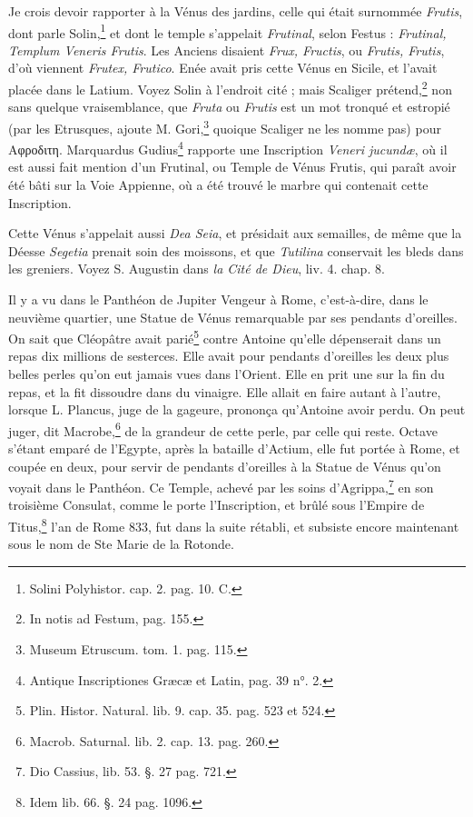 \documentclass[a4paper, 11pt, oneside, polutonikogreek, french]{article}
\begin{document}
Je crois devoir rapporter à la Vénus des jardins, celle qui était surnommée \emph{Frutis}, dont parle Solin,\footnote{Solini Polyhistor. cap. 2. pag. 10. C.} et dont le temple s'appelait \emph{Frutinal}, selon Festus : \emph{Frutinal, Templum Veneris Frutis}. Les Anciens disaient \emph{Frux, Fructis}, ou \emph{Frutis, Frutis}, d'où viennent \emph{Frutex, Frutico}. Enée avait pris cette Vénus en Sicile, et l'avait placée dans le Latium. Voyez Solin à l'endroit cité ; mais Scaliger prétend,\footnote{In notis ad Festum, pag. 155.} non sans quelque vraisemblance, que \emph{Fruta} ou \emph{Frutis} est un mot tronqué et estropié (par les Etrusques, ajoute M. Gori,\footnote{Museum Etruscum. tom. 1. pag. 115.} quoique Scaliger ne les nomme pas) pour Αφροδιτη. Marquardus Gudius\footnote{Antique Inscriptiones Græcæ et Latin, pag. 39 n°. 2.} rapporte une Inscription \emph{Veneri jucundæ}, où il est aussi fait mention d'un Frutinal, ou Temple de Vénus Frutis, qui paraît avoir été bâti sur la Voie Appienne, où a été trouvé le marbre qui contenait cette Inscription.

Cette Vénus s'appelait aussi \emph{Dea Seia}, et présidait aux semailles, de même que la Déesse \emph{Segetia} prenait soin des moissons, et que \emph{Tutilina} conservait les bleds dans les greniers. Voyez S. Augustin dans \emph{la Cité de Dieu}, liv. 4. chap. 8.

Il y a vu dans le Panthéon de Jupiter Vengeur à Rome, c'est-à-dire, dans le neuvième quartier, une Statue de Vénus remarquable par ses pendants d'oreilles. On sait que Cléopâtre avait parié\footnote{Plin. Histor. Natural. lib. 9. cap. 35. pag. 523 et 524.} contre Antoine qu'elle dépenserait dans un repas dix millions de sesterces. Elle avait pour pendants d'oreilles les deux plus belles perles qu'on eut jamais vues dans l'Orient. Elle en prit une sur la fin du repas, et la fit dissoudre dans du vinaigre. Elle allait en faire autant à l'autre, lorsque L. Plancus, juge de la gageure, prononça qu'Antoine avoir perdu. On peut juger, dit Macrobe,\footnote{Macrob. Saturnal. lib. 2. cap. 13. pag. 260.} de la grandeur de cette perle, par celle qui reste. Octave s'étant emparé de l'Egypte, après la bataille d'Actium, elle fut portée à Rome, et coupée en deux, pour servir de pendants d'oreilles à la Statue de Vénus qu'on voyait dans le Panthéon. Ce Temple, achevé par les soins d'Agrippa,\footnote{Dio Cassius, lib. 53. §. 27 pag. 721.} en son troisième Consulat, comme le porte l'Inscription, et brûlé sous l'Empire de Titus,\footnote{Idem lib. 66. §. 24 pag. 1096.} l'an de Rome 833, fut dans la suite rétabli, et subsiste encore maintenant sous le nom de Ste Marie de la Rotonde.
\end{document}
